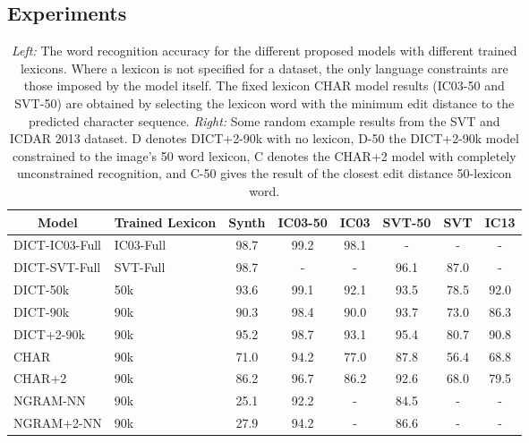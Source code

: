 \documentclass{article} \usepackage{nips14submit_e,times}
\begin{document}
\subsection{Experiments}\label{sec:experiments}

\begin{table}[t]
\begin{center}\scriptsize \setlength{\tabcolsep}{3pt}
\begin{tabular}[t]{|l|l||c|c|c|c|c|c|} 
\hline
\multicolumn{1}{|c|}{\centering Model} & 
\multicolumn{1}{p{1.0cm}||}{\centering Trained Lexicon} &
\multicolumn{1}{p{1.2cm}|}{\centering Synth} &
\multicolumn{1}{c|}{\centering IC03-50} &
\multicolumn{1}{c|}{\centering IC03} &
\multicolumn{1}{c|}{\centering SVT-50} &
\multicolumn{1}{c|}{\centering SVT} &
\multicolumn{1}{c|}{\centering IC13}
\\
\hline\hline
DICT-IC03-Full & IC03-Full & 98.7 & 99.2 &  98.1 & - & - & - \\
\rowcolor{Gray}
DICT-SVT-Full & SVT-Full  & 98.7 & - & - & 96.1 & 87.0 & -\\
DICT-50k & 50k       & 93.6 & 99.1 & 92.1 & 93.5 & 78.5 & 92.0 \\ 
\rowcolor{Gray}
DICT-90k & 90k       & 90.3 & 98.4 & 90.0 & 93.7 & 73.0 & 86.3 \\ 
DICT+2-90k & 90k     & 95.2 & 98.7 & 93.1 & 95.4 & 80.7 & 90.8 \\
\rowcolor{Gray}
CHAR & 90k       & 71.0 & 94.2 & 77.0 & 87.8 & 56.4 & 68.8 \\ 
CHAR+2 & 90k     & 86.2 & 96.7 & 86.2 & 92.6 & 68.0 & 79.5 \\
\rowcolor{Gray}
NGRAM-NN & 90k      & 25.1 & 92.2 & - & 84.5 & - & -\\
NGRAM+2-NN & 90k    & 27.9 & 94.2 & - & 86.6 & - & - \\
\hline
\end{tabular}
\qquad\quad
{}\end{center}
\vspace*{-1em}
\caption{\small \emph{Left:} The word recognition accuracy for the different proposed models with different trained lexicons. Where a lexicon is not specified for a dataset, the only language constraints are those imposed by the model itself. The fixed lexicon CHAR model results (IC03-50 and SVT-50) are obtained by selecting the lexicon word with the minimum edit distance to the predicted character sequence. 
\emph{Right:} Some random example results from the SVT and ICDAR 2013 dataset. D denotes DICT+2-90k with no lexicon, D-50 the DICT+2-90k model constrained to the image's 50 word lexicon, C denotes the CHAR+2 model with completely unconstrained recognition, and C-50 gives the result of the closest edit distance 50-lexicon word.} 
\label{table:internal}
\end{table}
\end{document}
